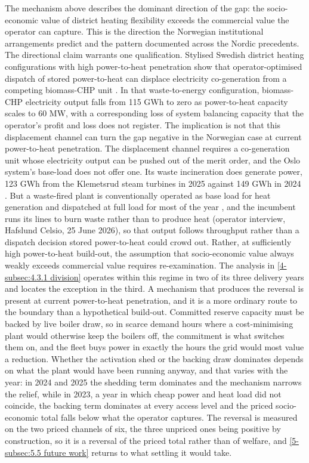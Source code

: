 The mechanism above describes the dominant direction of the gap: the socio-economic value of district heating flexibility exceeds the commercial value the operator can capture. This is the direction the Norwegian institutional arrangements predict and the pattern documented across the Nordic precedents. The directional claim warrants one qualification. Stylised Swedish district heating configurations with high power-to-heat penetration show that operator-optimised dispatch of stored power-to-heat can displace electricity co-generation from a competing biomass-CHP unit \cite{monie_power--heat_2022}. In that waste-to-energy configuration, biomass-CHP electricity output falls from 115 GWh to zero as power-to-heat capacity scales to 60 MW, with a corresponding loss of system balancing capacity that the operator's profit and loss does not register. The implication is not that this displacement channel can turn the gap negative in the Norwegian case at current power-to-heat penetration. The displacement channel requires a co-generation unit whose electricity output can be pushed out of the merit order, and the Oslo system's base-load does not offer one. Its waste incineration does generate power, 123 GWh from the Klemetsrud steam turbines in 2025 against 149 GWh in 2024 \cite{hafslund_arsrapport_nodate}. But a waste-fired plant is conventionally operated as base load for heat generation and dispatched at full load for most of the year \cite{beiron_combined_2020}, and the incumbent runs its lines to burn waste rather than to produce heat (operator interview, Hafslund Celsio, 25 June 2026), so that output follows throughput rather than a dispatch decision stored power-to-heat could crowd out. Rather, at sufficiently high power-to-heat build-out, the assumption that socio-economic value always weakly exceeds commercial value requires re-examination. The analysis in \autoref{4-subsec:4.3.1 division} operates within this regime in two of its three delivery years and locates the exception in the third. A mechanism that produces the reversal is present at current power-to-heat penetration, and it is a more ordinary route to the boundary than a hypothetical build-out. Committed reserve capacity must be backed by live boiler draw, so in scarce demand hours where a cost-minimising plant would otherwise keep the boilers off, the commitment is what switches them on, and the fleet buys power in exactly the hours the grid would most value a reduction. Whether the activation shed or the backing draw dominates depends on what the plant would have been running anyway, and that varies with the year: in 2024 and 2025 the shedding term dominates and the mechanism narrows the relief, while in 2023, a year in which cheap power and heat load did not coincide, the backing term dominates at every access level and the priced socio-economic total falls below what the operator captures. The reversal is measured on the two priced channels of six, the three unpriced ones being positive by construction, so it is a reversal of the priced total rather than of welfare, and \autoref{5-subsec:5.5 future work} returns to what settling it would take.


